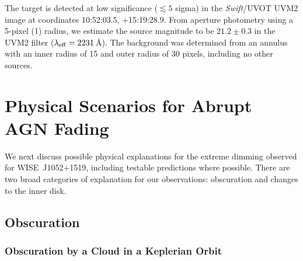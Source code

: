 \documentclass[iop]{emulateapj}
\def\qso{WISE~J1052+1519}
\begin{document}
The target is detected at low significance ($\lesssim 5$ sigma) in
the {\em Swift}/UVOT UVM2 image at coordinates 10:52:03.5, +15:19:28.9.
From aperture photometry using a 5-pixel (1) radius, we
estimate the source magnitude to be $21.2\pm0.3$ in the UVM2 filter
($\lambda_{\rm eff}=2231$\,\AA). The background was determined from
an annulus with an inner radius of 15 and outer radius of 30 pixels,
including no other sources.





% 
% 


\section{Physical Scenarios for Abrupt AGN Fading}
\label{sec:explanations}

We next discuss possible physical explanations for the extreme
dimming observed for \qso, including testable predictions where
possible.  There are two broad categories of explanation for our
observations:  obscuration and changes to the inner disk.

\subsection{Obscuration}

\subsubsection{Obscuration by a Cloud in a Keplerian Orbit}
\end{document}

